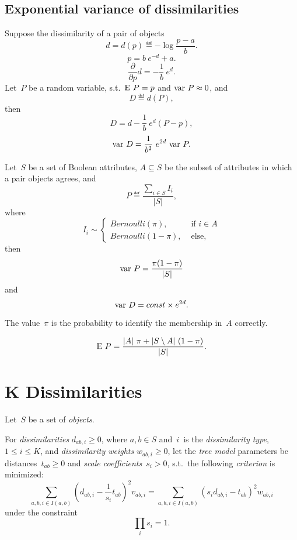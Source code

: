 \documentclass[10pt,a4paper]{article}
\theoremstyle{plain} \newtheorem{Lem}{Lemma}
\begin{document}
\subsection{Exponential variance of dissimilarities}
\comm{}

Suppose the dissimilarity of a pair of objects
$$ d = d(p) \eqdef - \log \frac {p - a} b. $$
$$ p = b \ e^{-d} + a. $$
$$ \frac \partial {\partial p} d = - \frac 1 b \ e^d. $$
Let~$P$ be a random variable, s.t.~$\mathrm E \  P = p$ and $\mathrm {var} \  P \approx 0$,
and
$$D \eqdef d(P), $$
then
$$ D = d - \frac 1 b \ e^{d} (P - p), $$
$$ \mathrm {var} \  D = \frac 1 {b^2} \ e^{2 d} \ \mathrm {var} \  P. $$

Let~$S$ be a set of Boolean attributes,
$A \subseteq S$ be the subset of attributes in which a pair objects agrees,
and
$$ P \eqdef \frac {\sum_{i \in S} I_i} {|S|}, $$
where
$$ I_i \sim 
    \begin{cases}
        Bernoulli(\pi),  &\text{ if } i \in A\\
        Bernoulli(1-\pi),  &\text{ else},
    \end{cases}
$$
then
$$ \mathrm {var} \  P = \frac {\pi (1 - \pi)} {|S|} $$
and
$$ \mathrm {var} \  D = const \times e^{2 d}. $$

The value~$\pi$ is the probability to identify the membership in~$A$ correctly.

$$ \mathrm E \  P = \frac {|A| \ \pi + |S \setminus A| \ (1 - \pi)} {|S|}. $$



\section{K Dissimilarities}

  
  Let~$S$ be a set of {\em objects}.
  
  For {\em dissimilarities} $d_{ab,i} \ge 0$, 
  where $a, b \in S$ and~$i$~is the {\em dissimilarity type}, $1 \le i \le K$,
  and {\em dissimilarity weights} $w_{ab,i} \ge 0$,
  let the {\em tree model} parameters be distances~$t_{ab} \ge 0$ and {\em scale coefficients}~$s_i > 0$,
  s.t.~the following {\em criterion} is minimized:
  \begin{equation} \label{tree_model_criterion}
  \sum_{a,b,i \in I(a,b)} \left(d_{ab,i} - \frac 1 {s_i} t_{ab}\right)^2 v_{ab,i}
  = \sum_{a,b,i \in I(a,b)} \left(s_i d_{ab,i} - t_{ab}\right)^2 w_{ab,i}
  \end{equation}
  under the constraint
  \begin{equation} \label{scale_constraint}
  \prod_i s_i = 1. 
  \end{equation}
  
\end{document}
